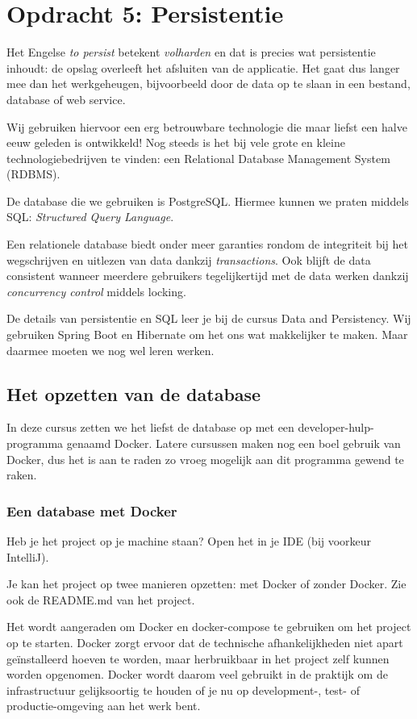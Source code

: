 \chapter{Opdracht 5: Persistentie}
Het Engelse \textit{to persist} betekent \textit{volharden} 
en dat is precies wat persistentie inhoudt:
de opslag overleeft het afsluiten van de applicatie.
Het gaat dus langer mee dan het werkgeheugen, bijvoorbeeld 
door de data op te slaan in een bestand, database of web service.

Wij gebruiken hiervoor een erg betrouwbare technologie die
maar liefst een halve eeuw geleden is ontwikkeld! Nog steeds 
is het bij vele grote en kleine technologiebedrijven te vinden: 
een Relational Database Management System (RDBMS).

De database die we gebruiken is PostgreSQL. 
Hiermee kunnen we praten middels SQL:
\textit{Structured Query Language}.

Een relationele database biedt onder meer garanties rondom de 
integriteit bij het wegschrijven en uitlezen van data 
dankzij \textit{transactions}. Ook blijft de data consistent 
wanneer meerdere gebruikers tegelijkertijd met de data werken
dankzij \textit{concurrency control} middels locking.

De details van persistentie en SQL leer je bij de cursus 
Data and Persistency. Wij gebruiken Spring Boot en Hibernate
om het ons wat makkelijker te maken. Maar daarmee moeten we nog 
wel leren werken.

\section{Het opzetten van de database}

In deze cursus zetten we het liefst de database op met een developer-hulp-programma genaamd Docker. 
Latere cursussen maken nog een boel gebruik van Docker, dus het is aan te raden zo vroeg mogelijk aan
dit programma gewend te raken.

\subsection{Een database met Docker}
Heb je het project op je machine staan? Open het in je IDE (bij voorkeur IntelliJ).

Je kan het project op twee manieren opzetten: met Docker of zonder Docker. 
Zie ook de README.md van het project. 

Het wordt aangeraden om Docker en docker-compose te gebruiken om het project op te starten.
Docker zorgt ervoor dat de technische afhankelijkheden niet apart geïnstalleerd hoeven te worden,
maar herbruikbaar in het project zelf kunnen worden opgenomen.
Docker wordt daarom veel gebruikt in de praktijk om de infrastructuur gelijksoortig te houden 
of je nu op development-, test- of productie-omgeving aan het werk bent.

